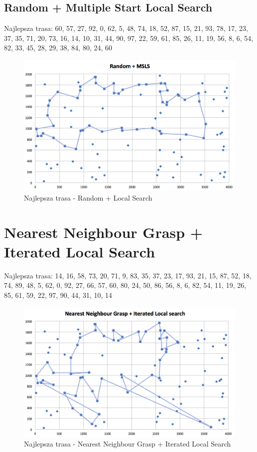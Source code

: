\documentclass[a4paper 10pt]{article}
\begin{document}
\subsection{Random + Multiple Start Local Search}
Najlepsza trasa: 60, 57, 27, 92, 0, 62, 5, 48, 74, 18, 52, 87, 15, 21, 93, 78, 17, 23, 37, 35, 71, 20, 73, 16, 14, 10, 31, 44, 90, 97, 22, 59, 61, 85, 26, 11, 19, 56, 8, 6, 54, 82, 33, 45, 28, 29, 38, 84, 80, 24, 60 
\begin{figure} [H]
\centering
\includegraphics[angle=0,width = 1\textwidth, height=!]{images/Random_MSLS.png}
\caption{Najlepsza trasa - Random + Local Search}
\label{Rys. NN}
\end{figure}

\newpage
\section{Nearest Neighbour Grasp + Iterated Local Search}
Najlepsza trasa: 14, 16, 58, 73, 20, 71, 9, 83, 35, 37, 23, 17, 93, 21, 15, 87, 52, 18, 74, 89, 48, 5, 62, 0, 92, 27, 66, 57, 60, 80, 24, 50, 86, 56, 8, 6, 82, 54, 11, 19, 26, 85, 61, 59, 22, 97, 90, 44, 31, 10, 14 

\begin{figure} [H]
\centering
\includegraphics[angle=0,width = 1\textwidth, height=!]{images/NNG_ILS.png}
\caption{Najlepsza trasa - Nearest Neighbour Grasp + Iterated Local Search}
\label{Rys. NN}
\end{figure}
\end{document}
